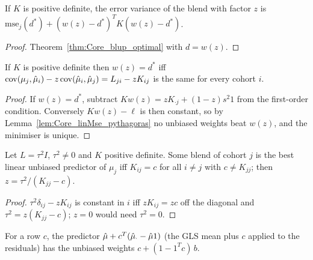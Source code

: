 \begin{theorem}\label{thm:Core_blend_price}
  \leanok
  If $K$ is positive definite, the error variance of the blend with factor $z$
  is $\mathrm{mse}_j(d^*) + (w(z)-d^*)^TK(w(z)-d^*)$.
\end{theorem}
\begin{proof}
  \leanok
  Theorem~\ref{thm:Core_blup_optimal} with $d = w(z)$.
\end{proof}

\begin{theorem}\label{thm:Core_blend_blup_iff}
  \leanok
  If $K$ is positive definite then $w(z) = d^*$ iff
  $\operatorname{cov}(\mu_j,\hat\mu_i) - z\operatorname{cov}(\hat\mu_i,\hat\mu_j) = L_{ji} - zK_{ij}$ is the same
  for every cohort $i$.
\end{theorem}
\begin{proof}
  \leanok
  If $w(z) = d^*$, subtract $Kw(z) = zK_{\cdot j} + (1-z)s^2 1$ from the
  first-order condition. Conversely $Kw(z) - \ell$ is then constant, so by
  Lemma~\ref{lem:Core_linMse_pythagoras} no unbiased weights beat $w(z)$, and
  the minimiser is unique.
\end{proof}

\begin{corollary}\label{cor:Core_blend_blup_equalCol}
  \leanok
  Let $L = \tau^2 I$, $\tau^2 \ne 0$ and $K$ positive definite. Some blend of
  cohort $j$ is the best linear unbiased predictor of $\mu_j$ iff
  $K_{ij} = c$ for all $i \ne j$ with $c \ne K_{jj}$; then
  $z = \tau^2/(K_{jj} - c)$.
\end{corollary}
\begin{proof}
  \leanok
  $\tau^2\delta_{ij} - zK_{ij}$ is constant in $i$ iff $zK_{ij} = zc$ off the
  diagonal and $\tau^2 = z(K_{jj} - c)$; $z = 0$ would need $\tau^2 = 0$.
\end{proof}

\begin{definition}\label{def:Core_residualWeight}
  \leanok
  For a row $c$, the predictor $\hat\mu + c^T(\hat\mu_\cdot - \hat\mu 1)$ (the GLS mean plus $c$
  applied to the residuals) has the unbiased weights $c + (1 - 1^Tc)\,b$.
\end{definition}


